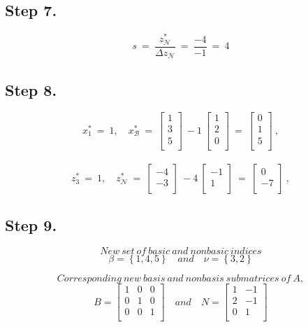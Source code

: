 \documentclass [12pt] {article}
\begin{document}
\subsection{Step 7.}
\[
s \ =\ \frac{z_{\mathcal N}^{*}}{ \Delta z_{\mathcal N}}\ =\ \frac{-4}{-1}\ =\ 4
\]

\subsection{Step 8.}
\[
x_{1}^{*}\ =\ 1, \quad x_{\mathcal B}^{*}\ =\
\begin{bmatrix}
1 \\
3 \\
5 \\
\end{bmatrix}\ -1\
\begin{bmatrix}
1 \\
2 \\
0 \\
\end{bmatrix}\ =\
\begin{bmatrix}
0 \\
1 \\
5 \\
\end{bmatrix}\ ,
\]
\\

\[
z_{3}^{*}\ =\ 1, \quad z_{\mathcal N}^{*}\ =\
\begin{bmatrix}
-4 \\
-3 \\
\end{bmatrix}\ -4\
\begin{bmatrix}
-1 \\
1 \\
\end{bmatrix}\ =\
\begin{bmatrix}
0 \\
-7 \\
\end{bmatrix}\ ,
\]

\subsection{Step 9.}

\[ New\ set\  of\  basic\  and\  nonbasic\  indices \]
\[
\beta= \left\{1,4,5\right\} \quad and \quad  \nu=\left\{3,2\right\}
\]

\[
Corresponding\ new\ basis\ and\ nonbasis\ submatrices\ of\ A,
\]
\[
B =
\begin{bmatrix}
1 & 0 & 0 \\
0 &1 & 0\\
0 & 0 & 1\\
\end{bmatrix} \quad and \quad
\mathit{N} =
\begin{bmatrix}
1 & -1 \\
2 &-1\\
0 &1\\
\end{bmatrix}
\]
\end{document}
